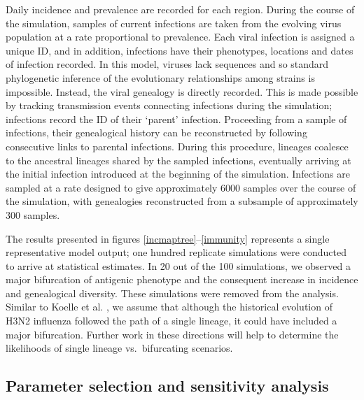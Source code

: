 \documentclass[11pt,oneside,letterpaper]{article}
\begin{document}
Daily incidence and prevalence are recorded for each region.  During the course of the simulation, samples of current infections are taken from the evolving virus population at a rate proportional to prevalence.  Each viral infection is assigned a unique ID, and in addition, infections have their phenotypes, locations and dates of infection recorded.  In this model, viruses lack sequences and so standard phylogenetic inference of the evolutionary relationships among strains is impossible.  Instead, the viral genealogy is directly recorded.  This is made possible by tracking transmission events connecting infections during the simulation; infections record the ID of their `parent' infection.  Proceeding from a sample of infections, their genealogical history can be reconstructed by following consecutive links to parental infections.  During this procedure, lineages coalesce to the ancestral lineages shared by the sampled infections, eventually arriving at the initial infection introduced at the beginning of the simulation.  Infections are sampled at a rate designed to give approximately 6000 samples over the course of the simulation, with genealogies reconstructed from a subsample of approximately 300 samples.

The results presented in figures \ref{incmaptree}--\ref{immunity} represents a single representative model output; one hundred replicate simulations were conducted to arrive at statistical estimates.  In 20 out of the 100 simulations, we observed a major bifurcation of antigenic phenotype and the consequent increase in incidence and genealogical diversity.  These simulations were removed from the analysis.   Similar to Koelle et al. \cite{Koelle11}, we assume that although the historical evolution of H3N2 influenza followed the path of a single lineage, it could have included a major bifurcation.  Further work in these directions will help to determine the likelihoods of single lineage vs.\ bifurcating scenarios.

\subsection*{Parameter selection and sensitivity analysis}
\end{document}
